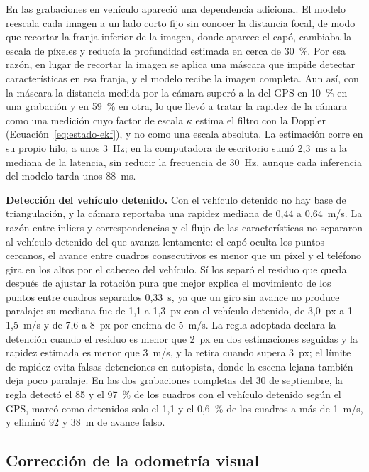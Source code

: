 En las grabaciones en vehículo apareció una dependencia adicional.
El modelo reescala cada imagen a un lado corto fijo sin conocer la distancia focal, de modo que recortar la franja inferior de la imagen, donde aparece el capó, cambiaba la escala de píxeles y reducía la profundidad estimada en cerca de 30~\%.
Por esa razón, en lugar de recortar la imagen se aplica una máscara que impide detectar características en esa franja, y el modelo recibe la imagen completa.
Aun así, con la máscara la distancia medida por la cámara superó a la del GPS en 10~\% en una grabación y en 59~\% en otra, lo que llevó a tratar la rapidez de la cámara como una medición cuyo factor de escala $\kappa$ estima el filtro con la Doppler (Ecuación~\eqref{eq:estado-ekf}), y no como una escala absoluta.
La estimación corre en su propio hilo, a unos 3~Hz; en la computadora de escritorio sumó 2,3~ms a la mediana de la latencia, sin reducir la frecuencia de 30~Hz, aunque cada inferencia del modelo tarda unos 88~ms.

\textbf{Detección del vehículo detenido.}
Con el vehículo detenido no hay base de triangulación, y la cámara reportaba una rapidez mediana de 0,44 a 0,64~m/s.
La razón entre inliers y correspondencias y el flujo de las características no separaron al vehículo detenido del que avanza lentamente: el capó oculta los puntos cercanos, el avance entre cuadros consecutivos es menor que un píxel y el teléfono gira en los altos por el cabeceo del vehículo.
Sí los separó el residuo que queda después de ajustar la rotación pura que mejor explica el movimiento de los puntos entre cuadros separados 0,33~s, ya que un giro sin avance no produce paralaje: su mediana fue de 1,1 a 1,3~px con el vehículo detenido, de 3,0~px a 1--1,5~m/s y de 7,6 a 8~px por encima de 5~m/s.
La regla adoptada declara la detención cuando el residuo es menor que 2~px en dos estimaciones seguidas y la rapidez estimada es menor que 3~m/s, y la retira cuando supera 3~px; el límite de rapidez evita falsas detenciones en autopista, donde la escena lejana también deja poco paralaje.
En las dos grabaciones completas del 30 de septiembre, la regla detectó el 85 y el 97~\% de los cuadros con el vehículo detenido según el GPS, marcó como detenidos solo el 1,1 y el 0,6~\% de los cuadros a más de 1~m/s, y eliminó 92 y 38~m de avance falso.

\subsection{Corrección de la odometría visual}
\label{sec:res-vo}

